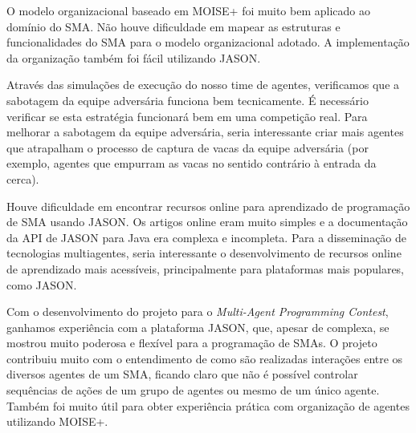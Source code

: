 \documentclass{llncs}
\begin{document}
O modelo organizacional baseado em MOISE+ foi muito bem aplicado ao domínio do SMA. Não houve dificuldade em mapear as estruturas e funcionalidades do SMA para o modelo organizacional adotado. A implementação da organização também foi fácil utilizando JASON.


Através das simulações de execução do nosso time de agentes, verificamos que a sabotagem da equipe adversária funciona bem tecnicamente. É necessário verificar se esta estratégia funcionará bem em uma competição real. Para melhorar a sabotagem da equipe adversária, seria interessante criar mais agentes que atrapalham o processo de captura de vacas da equipe adversária (por exemplo, agentes que empurram as vacas no sentido contrário à entrada da cerca).

Houve dificuldade em encontrar recursos online para aprendizado de programação de SMA usando JASON. Os artigos online eram muito simples e a documentação da API de JASON para Java era complexa e incompleta. Para a disseminação de tecnologias multiagentes, seria interessante o desenvolvimento de recursos online de aprendizado mais acessíveis, principalmente para plataformas mais populares, como JASON.

Com o desenvolvimento do projeto para o \textit{Multi-Agent Programming Contest}, ganhamos experiência com a plataforma JASON, que, apesar de complexa, se mostrou muito poderosa e flexível para a programação de SMAs. O projeto contribuiu muito com o entendimento de como são realizadas interações entre os diversos agentes de um SMA, ficando claro que não é possível controlar sequências de ações de um grupo de agentes ou mesmo de um único agente. Também foi muito útil para obter experiência prática com organização de agentes utilizando MOISE+.



\end{document}
